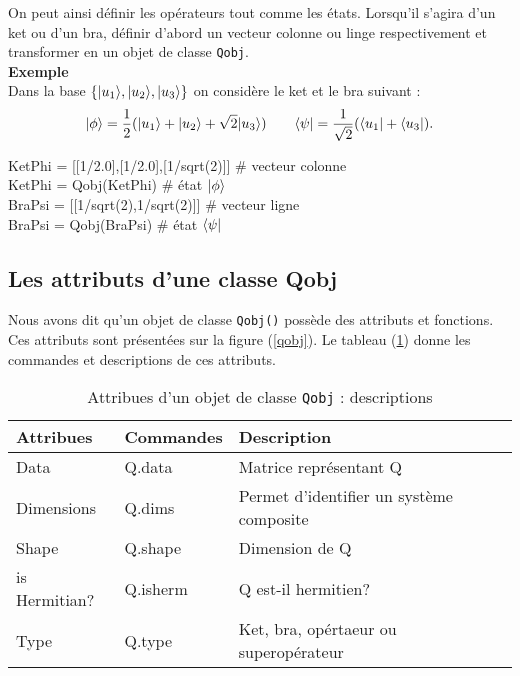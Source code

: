 On peut ainsi définir les opérateurs tout comme les états. Lorsqu'il s'agira 
d'un ket ou d'un bra, définir d'abord un vecteur colonne ou linge respectivement 
et transformer en un objet de classe \texttt{Qobj}.\\
\textbf{Exemple}\\
Dans la base $\{\vert u_1\rangle,\vert u_2\rangle,\vert u_3\rangle\}$ on considère le ket et le bra 
suivant :
\begin{equation}
\vert\phi\rangle=\dfrac{1}{2}(\vert u_1\rangle+\vert u_2\rangle+\sqrt{2}\vert u_3\rangle) \qquad 
\langle\psi\vert=\dfrac{1}{\sqrt{2}}(\langle u_1\vert+\langle u_3\vert).
\end{equation}
\begin{tt}
KetPhi = [[1/2.0],[1/2.0],[1/sqrt(2)]] \# vecteur colonne \\
KetPhi = Qobj(KetPhi)  \# état $\vert\phi\rangle$ \\
BraPsi = [[1/sqrt(2),1/sqrt(2)]] \# vecteur ligne \\
BraPsi = Qobj(BraPsi) \# état $\langle\psi\vert$ \\
\end{tt}

\subsection{Les attributs d'une classe Qobj}

Nous avons dit qu'un objet de classe \texttt{Qobj()} possède des attributs et 
fonctions. Ces attributs sont présentées sur la figure (\ref{qobj}). Le tableau 
(\ref{class}) donne les commandes et descriptions de ces attributs.
\begin{table}[!h]
\begin{center}
\begin{tabular}{|l|l|l|} \hline \hline
\textbf{Attribues} &\textbf{Commandes}	&\textbf{Description}\\ \hline \hline
Data	&Q.data	&Matrice représentant Q\\ \hline
Dimensions	&Q.dims	&Permet d'identifier un système composite\\ \hline
Shape	&Q.shape	&Dimension de Q\\ \hline
is Hermitian?	&Q.isherm	&Q est-il hermitien?\\ \hline
Type	&Q.type	&Ket, bra, opértaeur ou superopérateur\\ \hline
\end{tabular}
\caption{Attribues d'un objet de classe \texttt{Qobj} : descriptions}
\label{class}
\end{center}
\end{table}

